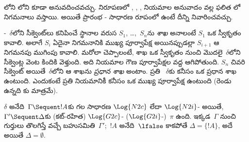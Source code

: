 \documentclass[../../../include/open-logic-section]{subfiles}
\begin{document}
లోని  లోని  కూడా అనువదించవచ్చు.  నిరూపణలో \Elim{\land}, \Elim{\lif}, \Elim{\lnot}, \Elim{\lforall} నియమాల అనువాదం వల్ల ఫలిత  లో~\Cut{} నిగమనాలు వస్తాయి. అయితే ప్రారంభ - సాధారణ రూపంలో ఉంటే దీన్ని నివారించవచ్చు.

-~$\delta$లోని సీక్వెంట్‌లు కనిపించే స్థానాల వరుస $S_1$, \dots,~$S_n$ను \emph{శాఖ} అనాలంటే $S_1$ ఒక స్వీకృతం కావాలి. అలాగే $S_i$ ఏదైనా నిగమనానికి ముఖ్య పూర్వాపేక్ష అయినప్పుడల్లా $S_{i+1}$ ఆ నిగమనపు ముగింపు కావాలి. మరోలా చెప్పాలంటే, శాఖ ఒక స్వీకృతం నుంచి మొదలై~$\delta$లోని సీక్వెంట్ల వెంట కిందికి వెళ్తుంది. అది  నియమాల గౌణ పూర్వాపేక్షల వద్ద ఆగిపోతుంది. $S_n$ చివరి సీక్వెంట్ అయితే~$\delta$లోని ఆ శాఖను \emph{ప్రధాన శాఖ} అంటాం. ప్రతి ~$\delta$కు కనీసం ఒక ప్రధాన శాఖ ఉంటుంది. ఎందుకంటే ప్రతి నియమానికీ కనీసం ఒక ముఖ్య పూర్వాపేక్ష ఉంటుంది (రెండు ఉన్నది \Intro{\land}కు మాత్రమే).

\begin{prop} $\delta$ అనేది~$\Gamma \Sequent !A$కు గల సాధారణ $\Log{N2c}$ లేదా $\Log{N2i}$- అయితే, $\Gamma' \Sequent \Delta$కు (కట్-రహిత) $\Log{G2c}$- ($\Log{G2i}$-)~$\pi$ ఉంది. ఇక్కడ~$\Gamma$ నుంచి గుర్తులు తొలగిస్తే వచ్చే  బహుసమితి~$\Gamma'$;~$!A$ అనేది~$\lfalse$ కాకపోతే $\Delta = \{!A\}$, అదే అయితే $\Delta = \emptyset$.
\end{prop}
\end{document}
